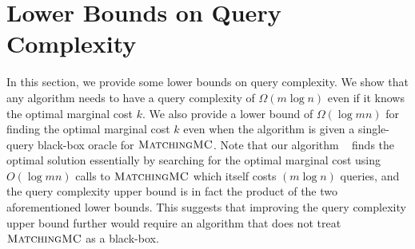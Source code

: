 \section{Lower Bounds on Query Complexity}\label{sec:lowerbound}
In this section, we provide some lower bounds on query complexity. We show that any algorithm needs to have a query complexity of $\Omega(m \log n)$ even if it knows the optimal marginal cost $k$. We also provide a lower bound of $\Omega(\log mn)$ for finding the optimal marginal cost $k$ even when the algorithm is given a single-query black-box oracle for $\textsc{MatchingMC}$. Note that our algorithm \mom~ finds the optimal solution essentially by searching for the optimal marginal cost using $O(\log mn)$ calls to $\textsc{MatchingMC}$ which itself costs $(m \log n)$ queries, and the query complexity upper bound is in fact the product of the two aforementioned lower bounds. This suggests that improving the query complexity upper bound further would require an algorithm that does not treat $\textsc{MatchingMC}$ as a black-box. 

